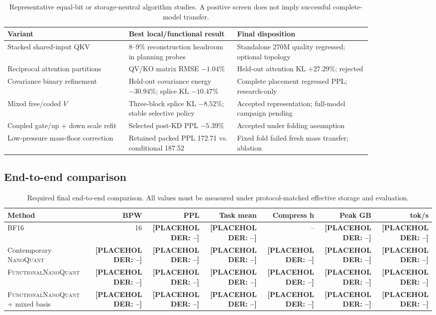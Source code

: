 \documentclass[10pt]{article}
\newcommand{\method}{\textsc{FunctionalNanoQuant}\xspace}
\newcommand{\nq}{\textsc{NanoQuant}\xspace}
\newcommand{\placeholder}[1]{\textcolor{red!70!black}{\textbf{[PLACEHOLDER: #1]}}}
\begin{document}
\begin{table}[t]
\centering
\caption{Representative equal-bit or storage-neutral algorithm studies. A
positive screen does not imply successful complete-model transfer.}
\label{tab:variants}
\small
\begin{tabular}{p{0.29\linewidth}p{0.25\linewidth}p{0.31\linewidth}}
\toprule
Variant & Best local/functional result & Final disposition \\
\midrule
Stacked shared-input QKV & 8--9\% reconstruction headroom in planning probes & Standalone 270M quality regressed; optional topology \\
Reciprocal attention partitions & QV/KO matrix RMSE $-1.04\%$ & Held-out attention KL $+27.29\%$; rejected \\
Covariance binary refinement & Held-out covariance energy $-30.94\%$; splice KL $-10.47\%$ & Complete placement regressed PPL; research-only \\
Mixed free/coded $V$ & Three-block splice KL $-8.52\%$; stable selective policy & Accepted representation; full-model campaign pending \\
Coupled gate/up + down scale refit & Selected post-KD PPL $-5.39\%$ & Accepted under folding assumption \\
Low-pressure mass-floor correction & Retained packed PPL 172.71 vs. conditional 187.52 & Fixed fold failed fresh mass transfer; ablation \\
\bottomrule
\end{tabular}
\end{table}

\subsection{End-to-end comparison}

\begin{table}[t]
\centering
\caption{Required final end-to-end comparison. All values must be measured
under protocol-matched effective storage and evaluation.}
\label{tab:final}
\small
\begin{tabular}{lrrrrrr}
\toprule
Method & BPW & PPL & Task mean & Compress h & Peak GB & tok/s \\
\midrule
BF16 & 16 & \placeholder{--} & \placeholder{--} & -- & \placeholder{--} & \placeholder{--} \\
Contemporary \nq & \placeholder{--} & \placeholder{--} & \placeholder{--} & \placeholder{--} & \placeholder{--} & \placeholder{--} \\
\method & \placeholder{--} & \placeholder{--} & \placeholder{--} & \placeholder{--} & \placeholder{--} & \placeholder{--} \\
\method + mixed basis & \placeholder{--} & \placeholder{--} & \placeholder{--} & \placeholder{--} & \placeholder{--} & \placeholder{--} \\
\bottomrule
\end{tabular}
\end{table}
\end{document}
